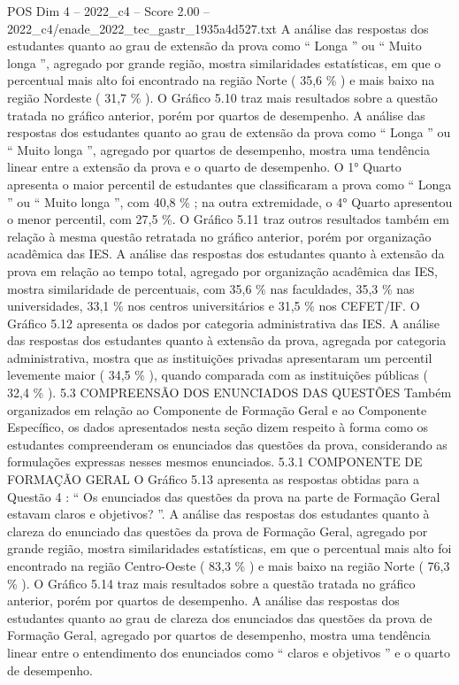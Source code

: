 \begin{textsample}{POS Dim 4 – 2022\_c4 – Score 2.00 – 2022\_c4/enade\_2022\_tec\_gastr\_1935a4d527.txt}
A análise das respostas dos estudantes quanto ao grau de extensão da prova como “ Longa ” ou “ Muito longa ”, agregado por grande região, mostra similaridades estatísticas, em que o percentual mais alto foi encontrado na região Norte ( 35,6 \% ) e mais baixo na região Nordeste ( 31,7 \% ).
O Gráfico 5.10 traz mais resultados sobre a questão tratada no gráfico anterior, porém por quartos de desempenho.
A análise das respostas dos estudantes quanto ao grau de extensão da prova como “ Longa ” ou “ Muito longa ”, agregado por quartos de desempenho, mostra uma tendência linear entre a extensão da prova e o quarto de desempenho.
O 1{\EmojiFont °} Quarto apresenta o maior percentil de estudantes que classificaram a prova como “ Longa ” ou “ Muito longa ”, com 40,8 \% ; na outra extremidade, o 4{\EmojiFont °} Quarto apresentou o menor percentil, com 27,5 \%.
O Gráfico 5.11 traz outros resultados também em relação à mesma questão retratada no gráfico anterior, porém por organização acadêmica das IES.
A análise das respostas dos estudantes quanto à extensão da prova em relação ao tempo total, agregado por organização acadêmica das IES, mostra similaridade de percentuais, com 35,6 \% nas faculdades, 35,3 \% nas universidades, 33,1 \% nos centros universitários e 31,5 \% nos CEFET/IF.
O Gráfico 5.12 apresenta os dados por categoria administrativa das IES.
A análise das respostas dos estudantes quanto à extensão da prova, agregada por categoria administrativa, mostra que as instituições privadas apresentaram um percentil levemente maior ( 34,5 \% ), quando comparada com as instituições públicas ( 32,4 \% ). 5.3 COMPREENSÃO DOS ENUNCIADOS DAS QUESTÕES Também organizados em relação ao Componente de Formação Geral e ao Componente Específico, os dados apresentados nesta seção dizem respeito à forma como os estudantes compreenderam os enunciados das questões da prova, considerando as formulações expressas nesses mesmos enunciados. 5.3.1 COMPONENTE DE FORMAÇÃO GERAL O Gráfico 5.13 apresenta as respostas obtidas para a Questão 4 : “ Os enunciados das questões da prova na parte de Formação Geral estavam claros e objetivos? ”.
A análise das respostas dos estudantes quanto à clareza do enunciado das questões da prova de Formação Geral, agregado por grande região, mostra similaridades estatísticas, em que o percentual mais alto foi encontrado na região Centro-Oeste ( 83,3 \% ) e mais baixo na região Norte ( 76,3 \% ).
O Gráfico 5.14 traz mais resultados sobre a questão tratada no gráfico anterior, porém por quartos de desempenho.
A análise das respostas dos estudantes quanto ao grau de clareza dos enunciados das questões da prova de Formação Geral, agregado por quartos de desempenho, mostra uma tendência linear entre o entendimento dos enunciados como “ claros e objetivos ” e o quarto de desempenho.

\end{textsample}
